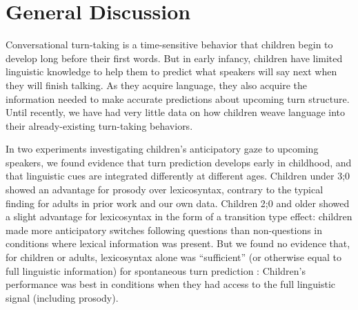 \documentclass[authoryear, 12pt]{elsarticle}
\begin{document}


\section{General Discussion}
\label{sec:gendisc}

Conversational turn-taking is a time-sensitive behavior that children begin to develop long before their first words. But in early infancy, children have limited linguistic knowledge to help them to predict what speakers will say next when they will finish talking. As they acquire language, they also acquire the information needed to make accurate predictions about upcoming turn structure. Until recently, we have had very little data on how children weave language into their already-existing turn-taking behaviors. 


In two experiments investigating children's anticipatory gaze to upcoming speakers, we found evidence that turn prediction develops early in childhood, and that linguistic cues are integrated differently at different ages. Children under 3;0 showed an advantage for prosody over lexicosyntax, contrary to the typical finding for adults in prior work \citep{de-ruiter2006} and our own data. Children 2;0 and older showed a slight advantage for lexicosyntax in the form of a transition type effect: children made more anticipatory switches following questions than non-questions in conditions where lexical information was present. 
But we found no evidence that, for children or adults, lexicosyntax alone was ``sufficient'' (or otherwise equal to full linguistic information) for spontaneous turn prediction \citep[pg. 531]{de-ruiter2006}: Children's performance was best in conditions when they had access to the full linguistic signal (including prosody). 
\end{document}
